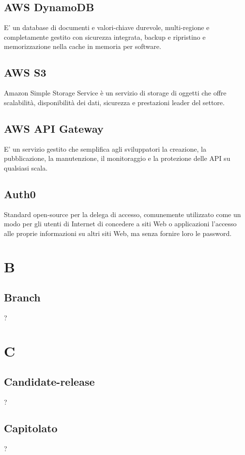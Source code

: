 \subsection*{AWS DynamoDB}
E' un database di documenti e valori-chiave durevole, multi-regione e completamente gestito con sicurezza integrata, backup e ripristino e memorizzazione nella cache in memoria per software.

\subsection*{AWS S3}
Amazon Simple Storage Service è un servizio di storage di oggetti che offre scalabilità, disponibilità dei dati, sicurezza e prestazioni leader del settore.

\subsection*{AWS API Gateway}
E' un servizio gestito che semplifica agli sviluppatori la creazione, la pubblicazione, la manutenzione, il monitoraggio e la protezione delle API su qualsiasi scala.

\subsection*{Auth0}
Standard open-source per la delega di accesso, comunemente utilizzato come un modo per gli utenti di Internet di concedere a siti Web o applicazioni l'accesso alle proprie informazioni su altri siti Web, ma senza fornire loro le password.

\section*{B}
\subsection*{Branch}
?

\section*{C}
\subsection*{Candidate-release}
?

\subsection*{Capitolato}
?


